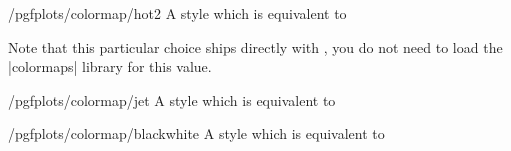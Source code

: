 \begin{stylekey}{/pgfplots/colormap/hot2}
    A style which is equivalent to
\begin{codeexample}
\end{codeexample}


    Note that this particular choice ships directly with \PGFPlots{}, you do not need to load the |colormaps| library for this value.

    \matlabcolormaptext
\end{stylekey}

\begin{stylekey}{/pgfplots/colormap/jet}
    A style which is equivalent to
\begin{codeexample}
\end{codeexample}


    \matlabcolormaptext
\end{stylekey}

\begin{stylekey}{/pgfplots/colormap/blackwhite}
    A style which is equivalent to
\begin{codeexample}
\end{codeexample}

\end{stylekey}

